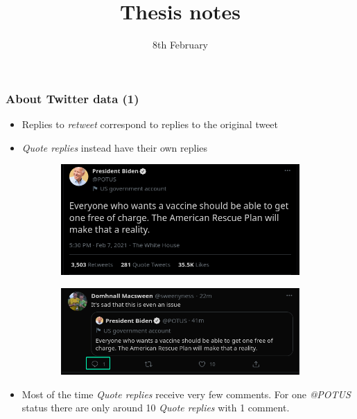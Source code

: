 \documentclass{beamer}
\begin{document}
\title{Thesis notes}
\date{8th February}
\frame{\titlepage}

\begin{frame}[c]
    \frametitle{About Twitter data (1)}
    \begin{itemize}
        \item Replies to \textit{retweet} correspond to replies to the original tweet
        \item \textit{Quote replies} instead have their own replies
    \end{itemize}

    \begin{figure}[h]
        \centering
        \begin{subfigure}[b]{0.6\textwidth}
            \begin{center}
                \includegraphics[width=0.8\linewidth]{img/potus_original.png}
            \end{center}
        \end{subfigure}

        \medskip

        \begin{subfigure}[b]{0.6\textwidth}
            \begin{center}
                \includegraphics[width=0.8\linewidth]{img/potus_reply.png}
            \end{center}
        \end{subfigure}
    \end{figure}

    \begin{itemize}
        \item Most of the time \textit{Quote replies} receive very few
            comments. For one \textit{@POTUS} status there are only around 10
            \textit{Quote replies} with 1 comment.
    \end{itemize}

\end{frame}
\end{document}
